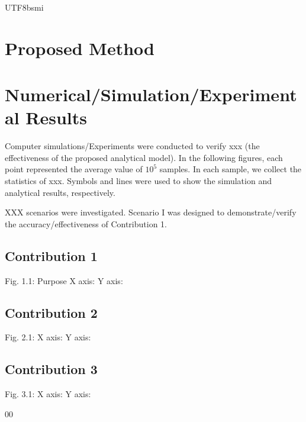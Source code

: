 \documentclass[conference]{IEEEtran}
\begin{document}
\begin{CJK}{UTF8}{bsmi}
\section{Proposed Method}
\section{Numerical/Simulation/Experimental Results}
Computer simulations/Experiments were conducted to verify xxx (the effectiveness of the proposed analytical model). 
In the following figures, each point represented the average value of $10^5$ samples. In each sample, we collect the statistics of xxx. Symbols and lines were used to show the simulation and analytical results, respectively. 

XXX scenarios were investigated. Scenario I was designed to demonstrate/verify the accuracy/effectiveness of Contribution 1.

\subsection{Contribution 1}
Fig. 1.1: Purpose
    X axis: 
    Y axis:
\subsection{Contribution 2}
Fig. 2.1: 
    X axis: 
    Y axis:
\subsection{Contribution 3}
Fig. 3.1: 
    X axis: 
    Y axis:
\begin{thebibliography}{00}
\end{thebibliography}
\end{CJK}\
\end{document}
